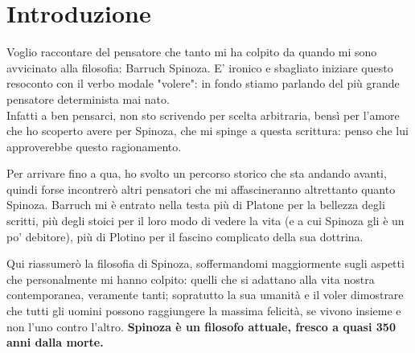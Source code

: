
\chapter*{Introduzione}

Voglio raccontare del pensatore che tanto mi ha colpito da quando mi sono avvicinato alla filosofia: Barruch Spinoza. E' ironico e sbagliato iniziare questo resoconto con il verbo modale "volere": in fondo stiamo parlando del più grande pensatore determinista mai nato.\\
Infatti a ben pensarci, non sto scrivendo per scelta arbitraria, bensì per l'amore che ho scoperto avere per Spinoza, che mi spinge a questa scrittura: penso che lui approverebbe questo ragionamento.

Per arrivare fino a qua, ho svolto un percorso storico che sta andando avanti, quindi forse incontrerò  altri pensatori che mi affascineranno altrettanto quanto Spinoza. Barruch mi è entrato nella testa più di Platone per la bellezza degli scritti, più degli stoici per il loro modo di vedere la vita (e a cui Spinoza gli è un po' debitore), più di Plotino per il fascino complicato della sua dottrina.

Qui riassumerò la filosofia di Spinoza, soffermandomi maggiormente sugli aspetti che  personalmente mi hanno colpito: quelli che si adattano alla vita nostra contemporanea, veramente tanti; sopratutto la sua umanità e il voler dimostrare che tutti gli uomini possono raggiungere la massima felicità, se vivono insieme e non l'uno contro l'altro. \textbf{Spinoza è un filosofo attuale, fresco a quasi 350 anni dalla morte.}
\newpage